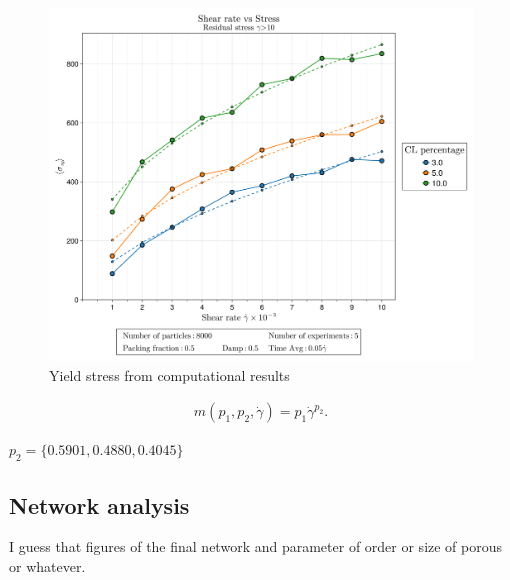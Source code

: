 \begin{figure}[ht!]
    \centering
    \includegraphics[width=\textwidth]{figs/ComputaitonalResults/yieldStress.png}
    \caption{Yield stress from computational results}\label{fig:yieldStressResults}
\end{figure}

\begin{gather}
    m(p_1,p_2,\dot{\gamma}) = p_1\dot{\gamma}^{p_2}.
\end{gather}

$p_2 = \{0.5901,0.4880,0.4045\}$

\subsection{Network analysis}

I guess that figures of the final network and parameter of order or size of porous or whatever.

